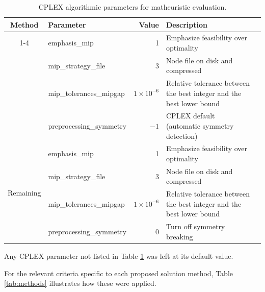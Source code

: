 

\begin{table}[H]
\centering
\caption{CPLEX algorithmic parameters for matheuristic evaluation.}
\label{tab:parameters_solverMILP2}
\scriptsize
\begin{tabular}{c>{\RaggedRight}p{3.5cm}r>{\RaggedRight}p{6cm}r}\toprule
Method & {Parameter} & {Value} & {Description} \\\cmidrule{1-4}
\multirow{4}{*}{{SM1}} &emphasis\_mip &1 &Emphasize feasibility over optimality \\
&mip\_strategy\_file &3 &Node file on disk and compressed \\
&mip\_tolerances\_mipgap & $1 \times 10^{-6}$ &Relative tolerance between the best integer and the best lower bound \\
&preprocessing\_symmetry &$-1$ &CPLEX default (automatic symmetry detection) \\
\bottomrule \bottomrule
\multirow{4}{*}{{Remaining}} &emphasis\_mip &1 &Emphasize feasibility over optimality \\
&mip\_strategy\_file &3 &Node file on disk and compressed \\
&mip\_tolerances\_mipgap & $1 \times 10^{-6}$ &Relative tolerance between the best integer and the best lower bound \\
&preprocessing\_symmetry &0 &Turn off symmetry breaking \\
\bottomrule
\end{tabular}
\end{table}

Any CPLEX parameter not listed in Table \ref{tab:parameters_solverMILP2} was left at its default value.

For the relevant criteria specific to each proposed solution method, Table \ref{tab:methods} illustrates how these were applied.

